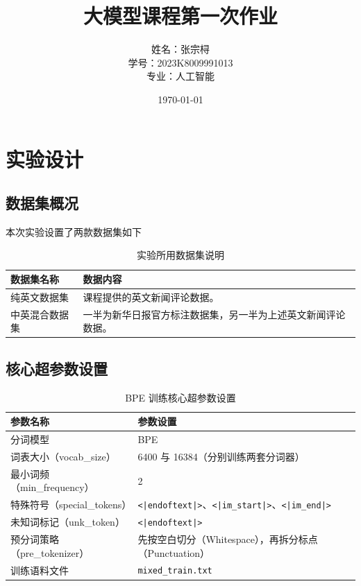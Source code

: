 \documentclass[a4paper,12pt]{ctexart} %
\title{\textbf{大模型课程第一次作业}}
\author{姓名：张宗桪 \\ 学号：2023K8009991013 \\ 专业：人工智能}
\date{\today}
\begin{document}
\pagestyle{plain} %

\maketitle
\thispagestyle{empty} %
\newpage

\tableofcontents
\newpage
\section{实验设计}


\subsection{数据集概况}
本次实验设置了两款数据集如下

\begin{table}[H]
    \centering
    \caption{实验所用数据集说明}
    \begin{tabular}{p{} p{}}
        \toprule
        数据集名称 & 数据内容 \\
        \midrule
        纯英文数据集 & 课程提供的英文新闻评论数据。 \\
        中英混合数据集 & 一半为新华日报官方标注数据集，另一半为上述英文新闻评论数据。 \\
        \bottomrule
    \end{tabular}
\end{table}

\subsection{核心超参数设置}

\begin{table}[H]
    \centering
    \caption{BPE 训练核心超参数设置}
    \begin{tabular}{p{} p{}}
        \toprule
        参数名称 & 参数设置 \\
        \midrule
        分词模型 & BPE \\
        词表大小（vocab\_size） & 6400 与 16384（分别训练两套分词器） \\
        最小词频（min\_frequency） & 2 \\
        特殊符号（special\_tokens） & \texttt{<|endoftext|>}、\texttt{<|im\_start|>}、\texttt{<|im\_end|>} \\
        未知词标记（unk\_token） & \texttt{<|endoftext|>} \\
        预分词策略（pre\_tokenizer） & 先按空白切分（Whitespace），再拆分标点（Punctuation） \\
        训练语料文件 & \texttt{mixed\_train.txt} \\
        \bottomrule
    \end{tabular}
\end{table}
\end{document}
